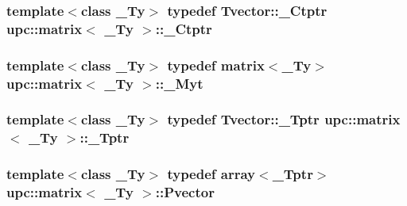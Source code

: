 \subsubsection[{\texorpdfstring{\+\_\+\+Ctptr}{_Ctptr}}]{\setlength{\rightskip}{0pt plus 5cm}template$<$class \+\_\+\+Ty$>$ typedef {\bf Tvector\+::\+\_\+\+Ctptr} {\bf upc\+::matrix}$<$ \+\_\+\+Ty $>$\+::{\bf \+\_\+\+Ctptr}\hspace{0.3cm}{\ttfamily [private]}}\hypertarget{classupc_1_1matrix_af4880980335adaf4abe61988558472f5}{}\label{classupc_1_1matrix_af4880980335adaf4abe61988558472f5}
\subsubsection[{\texorpdfstring{\+\_\+\+Myt}{_Myt}}]{\setlength{\rightskip}{0pt plus 5cm}template$<$class \+\_\+\+Ty$>$ typedef {\bf matrix}$<$\+\_\+\+Ty$>$ {\bf upc\+::matrix}$<$ \+\_\+\+Ty $>$\+::{\bf \+\_\+\+Myt}\hspace{0.3cm}{\ttfamily [private]}}\hypertarget{classupc_1_1matrix_a9e671131fc3af250bb4bad539474da9c}{}\label{classupc_1_1matrix_a9e671131fc3af250bb4bad539474da9c}
\subsubsection[{\texorpdfstring{\+\_\+\+Tptr}{_Tptr}}]{\setlength{\rightskip}{0pt plus 5cm}template$<$class \+\_\+\+Ty$>$ typedef {\bf Tvector\+::\+\_\+\+Tptr} {\bf upc\+::matrix}$<$ \+\_\+\+Ty $>$\+::{\bf \+\_\+\+Tptr}\hspace{0.3cm}{\ttfamily [private]}}\hypertarget{classupc_1_1matrix_a75a85786a5de55cdfcdf1f205df1f3e8}{}\label{classupc_1_1matrix_a75a85786a5de55cdfcdf1f205df1f3e8}
\subsubsection[{\texorpdfstring{Pvector}{Pvector}}]{\setlength{\rightskip}{0pt plus 5cm}template$<$class \+\_\+\+Ty$>$ typedef {\bf array}$<${\bf \+\_\+\+Tptr}$>$ {\bf upc\+::matrix}$<$ \+\_\+\+Ty $>$\+::{\bf Pvector}\hspace{0.3cm}{\ttfamily [private]}}\hypertarget{classupc_1_1matrix_a1f8337796d73b88280f6a517d2d1f20d}{}\label{classupc_1_1matrix_a1f8337796d73b88280f6a517d2d1f20d}
